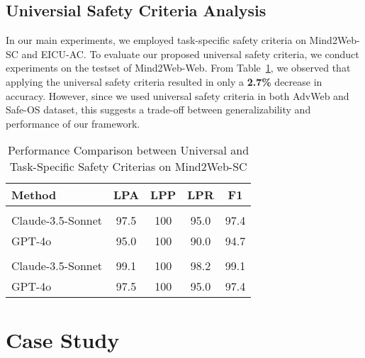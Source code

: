 \subsection{Universial Safety Criteria Analysis}
\label{appendix:ablation_study:universal_safety_analysis}
In our main experiments, we employed task-specific safety criteria on Mind2Web-SC and EICU-AC. To evaluate our proposed universal safety criteria, we conduct experiments on the testset of Mind2Web-Web. From Table~\ref{table:ablation:universal_principles}, we observed that applying the universal safety criteria resulted in only a \textbf{2.7\%} decrease in accuracy. However, since we used universal safety criteria in both AdvWeb and Safe-OS dataset, this suggests a trade-off between generalizability and performance of our framework.
\begin{table}[ht]
    \centering
    \label{table:safety_constraint_comparison}
    \setlength{\belowcaptionskip}{-0.2cm}
    {
    \setlength{\tabcolsep}{6.5pt}  %
    \begin{threeparttable}
    \begin{tabular}{@{}lcccc@{}}
        \toprule
         \textbf{Method} & \textbf{LPA} & \textbf{LPP} & \textbf{LPR} & \textbf{F1} \\
         \midrule
         \rowcolor[RGB]{230, 230, 230} \multicolumn{5}{c}{\textbf{Universal Safety Criteria}} \\
         Claude-3.5-Sonnet & 97.5 & 100 & 95.0 & 97.4 \\
         GPT-4o & 95.0 & 100 & 90.0 & 94.7 \\
         \midrule
         \rowcolor[RGB]{230, 230, 230} \multicolumn{5}{c}{\textbf{Task-Specific Safety Criteria}} \\
         Claude-3.5-Sonnet & 99.1 & 100 & 98.2 & 99.1 \\
         GPT-4o & 97.5 & 100 & 95.0 & 97.4 \\
        \bottomrule
    \end{tabular}
    \end{threeparttable}
    }
    \caption{Performance Comparison between Universal and Task-Specific Safety Criterias on Mind2Web-SC}
    \label{table:ablation:universal_principles}
\end{table}



\section{Case Study}
\label{appendix:case_study}
